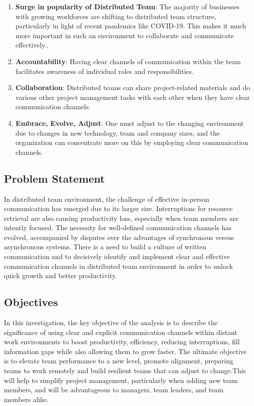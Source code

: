 \documentclass[runningheads]{llncs}
\begin{document}
    \begin{enumerate}
        \item \textbf{Surge in popularity of Distributed Team}: The majority of businesses with growing workforces are shifting to distributed team structure, particularly in light of recent pandemics like COVID-19. This makes it much more important in such an environment to collaborate and communicate effectively.. 
        \item \textbf{Accountability}: Having clear channels of communication within the team facilitates awareness of individual roles and responsibilities.
        \item \textbf{Collaboration}: Distributed teams can share project-related materials and do various other project management tasks with each other when they have clear communication channels. 
        \item \textbf{Embrace, Evolve, Adjust}: One must adjust to the changing environment due to changes in new technology, team and company sizes, and the organization can concentrate more on this by employing clear communication channels.
    \end{enumerate}
    
    \subsection{Problem Statement} In distributed team environment, the challenge of effective in-person communication has emerged due to its larger size. Interruptions for resource retrieval are also causing productivity loss, especially when team members are intently focused. The necessity for well-defined communication channels has evolved, accompanied by disputes over the advantages of synchronous versus asynchronous systems. There is a need to build a culture of written communication and to decisively identify and implement clear and effective communication channels in distributed team environment in order to unlock quick growth and better productivity.

    \subsection{Objectives} In this investigation, the key objective of the analysis is to describe the significance of using clear and explicit communication channels within distant work environments to boost productivity, efficiency, reducing interruptions, fill information gaps while also allowing them to grow faster. The ultimate objective is to elevate team performance to a new level, promote alignment, preparing teams to work remotely and build resilient teams that can adjust to change.This will help to simplify project management, particularly when adding new team members, and will be advantageous to managers, team leaders, and team members alike. 
    
\end{document}
